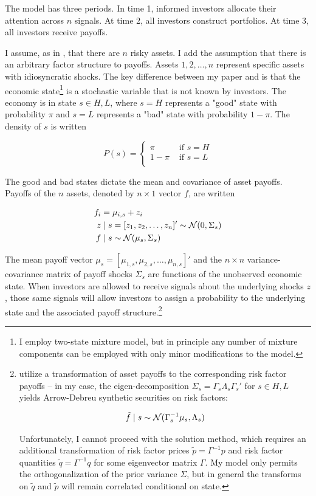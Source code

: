 \documentclass{article}
\begin{document}
The model has three periods. In time 1, informed investors allocate their attention across $n$ signals. At time 2, all investors construct portfolios. At time 3, all investors receive payoffs.

I assume, as in \textcite{kacperczyk_rational_2016}, that there are $n$ risky assets. I add the assumption that there is an  arbitrary factor structure to payoffs. Assets $1,2,\dots,n$ represent specific assets with idiosyncratic shocks. The key difference between my paper and \textcite{kacperczyk_rational_2016} is that the economic state\footnote{I employ two-state mixture model, but in principle any number of mixture components can be employed with only minor modifications to the model.} is a stochastic variable that is not known by investors. The economy is in state $s \in {H, L}$, where $s=H$ represents a "good" state with probability $\pi$ and $s=L$ represents a "bad" state with probability $1-\pi$. The density of $s$ is written

$$
P(s) = \begin{cases}
    \pi & \text{ if } s = H \\
    1-\pi & \text{ if } s = L \\
\end{cases}
$$

The good and bad states dictate the mean and covariance of asset payoffs. Payoffs of the $n$ assets, denoted by $n\times 1$ vector $f$, are written

\begin{align}
    f_i &= \mu_{i,s} + z_i\\
    z &\mid s = [z_1,z_2, \dots, z_n]' \sim \mathcal{N}(0, \Sigma_s) \\
    f &\mid s \sim \mathcal{N}(\mu_{s}, \Sigma_s)
\end{align}

The mean payoff vector $\mu_s = [\mu_{1,s},\mu_{2,s},\dots,\mu_{n,s}]'$ and the  $n\times n$ variance-covariance matrix of payoff shocks $\Sigma_s$ are functions of the unobserved economic state. When investors are allowed to receive signals about the underlying shocks $z$, those same signals will allow investors to assign a probability to the underlying state and the associated payoff structure.\footnote{\textcite{kacperczyk_rational_2016} utilize a transformation of asset payoffs to the corresponding risk factor payoffs -- in my case, the eigen-decomposition $\Sigma_s = \Gamma_s \Lambda_s \Gamma_s'$ for $s \in {H,L}$ yields Arrow-Debreu synthetic securities on risk factors:

\begin{align}
    \tilde f \mid s \sim \mathcal{N}(\Gamma_s^{-1} \mu_s, \Lambda_s)
\end{align}

\noindent Unfortunately, I cannot proceed with the \textcite{kacperczyk_rational_2016} solution method, which requires an additional transformation of risk factor prices $\tilde p = \Gamma^{-1}p$ and risk factor quantities $\tilde q = \Gamma^{-1} q$ for some eigenvector matrix $\Gamma$. My model only permits the orthogonalization of the prior variance $\Sigma$, but in general the transforms on $\tilde q$ and $\tilde p$ will remain correlated conditional on state.
}
\end{document}
